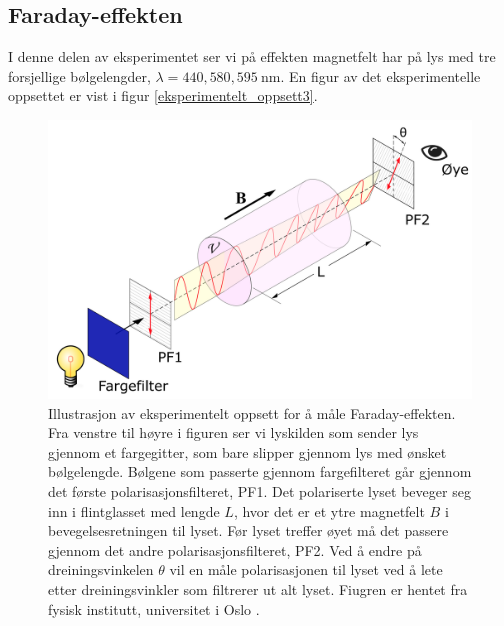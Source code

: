 \documentclass[%
 reprint,
 amsmath,amssymb,
 aps,
 norsk,
]{revtex4-1}
\begin{document}
\subsection{Faraday-effekten}
I denne delen av eksperimentet ser vi på effekten magnetfelt har på lys med tre forsjellige bølgelengder, $\lambda = 440, 580, \SI{595}{\nano\meter}$. En figur av det eksperimentelle oppsettet er vist i figur \vref{eksperimentelt_oppsett3}.
\begin{figure}[h!]
  \centering
  \includegraphics[scale=0.27]{oppsett3.png}
  \caption{Illustrasjon av eksperimentelt oppsett for å måle Faraday-effekten. Fra venstre til høyre i figuren ser vi lyskilden som sender lys gjennom et fargegitter, som bare slipper gjennom lys med ønsket bølgelengde. Bølgene som passerte gjennom fargefilteret går gjennom det første polarisasjonsfilteret, PF1. Det polariserte lyset beveger seg inn i flintglasset med lengde $L$, hvor det er et ytre magnetfelt $B$ i bevegelsesretningen til lyset. Før lyset treffer øyet må det passere gjennom det andre polarisasjonsfilteret, PF2. Ved å endre på dreiningsvinkelen $\theta$ vil en måle polarisasjonen til lyset ved å lete etter dreiningsvinkler som filtrerer ut alt lyset. Fiugren er hentet fra fysisk institutt, universitet i Oslo \cite{oppgave}.}
  \label{eksperimentelt_oppsett3}
\end{figure}
\end{document}
